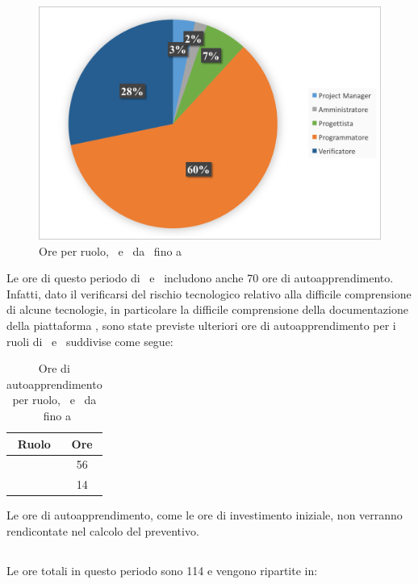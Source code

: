 \begin{figure}[H]
	\centering 
	\includegraphics[scale=0.7]{Immagini/GraficiTorte/COD.png}
	\caption{Ore per ruolo, \PD\ e \COD\ da \RP\ fino a \RQ}
\end{figure}

Le ore di questo periodo di \PD\ e \COD\ includono anche 70 ore di autoapprendimento. Infatti, dato il verificarsi del rischio tecnologico relativo alla difficile comprensione di alcune tecnologie, in particolare la difficile comprensione della documentazione della piattaforma , sono state previste ulteriori ore di autoapprendimento per i ruoli di \Progr\ e \Ver\ suddivise come segue:

\begin{table}[h]
	\begin{center}
		\begin{tabular}{|c|c|}
			\hline
			\textbf{Ruolo}	& \textbf{Ore} \\
			\hline
			\Progr	&	56\\
			\hline
			\Ver	&	14\\
			\hline
		\end{tabular}
	\end{center}
	\caption{Ore di autoapprendimento per ruolo, \PD\ e \COD\ da \RP\ fino a \RQ}
\end{table}

Le ore di autoapprendimento, come le ore di investimento iniziale, non verranno rendicontate nel calcolo del preventivo.

\newpage
\subsection{\VV}
Le ore totali in questo periodo sono 114 e vengono ripartite in:

